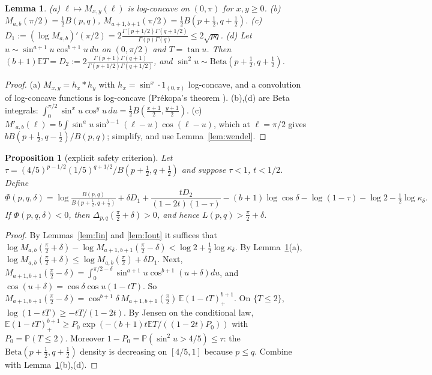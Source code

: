 \documentclass[11pt]{amsart}
\newtheorem{proposition}[theorem]{Proposition}
\newtheorem{lemma}[theorem]{Lemma}
\theoremstyle{definition}
\begin{document}
\begin{lemma}\label{lem:M}
(a) $\ell\mapsto M_{x,y}(\ell)$ is log-concave on $(0,\pi)$ for $x,y\ge0$.
(b) $M_{a,b}(\pi/2)=\frac12B(p,q)$, $M_{a+1,b+1}(\pi/2)=\frac12B(p+\frac12,q+\frac12)$.
(c) $D_1:=(\log M_{a,b})'(\pi/2)=2\frac{\Gamma(p+1/2)\Gamma(q+1/2)}{\Gamma(p)\Gamma(q)}\le2\sqrt{pq}$.
(d) Let $u\sim\sin^{a+1}u\cos^{b+1}u\,du$ on $(0,\pi/2)$ and $T=\tan u$. Then $(b+1)\mathbb E T=D_2:=2\frac{\Gamma(p+1)\Gamma(q+1)}{\Gamma(p+1/2)\Gamma(q+1/2)}$,
and $\sin^2u\sim\mathrm{Beta}(p+\frac12,q+\frac12)$.
\end{lemma}
\begin{proof}
(a) $M_{x,y}=h_x*h_y$ with $h_x=\sin^x\cdot1_{(0,\pi)}$ log-concave, and a convolution of log-concave functions is log-concave (Pr\'ekopa's theorem \cite{Pre}). (b),(d) are Beta integrals:
$\int_0^{\pi/2}\sin^xu\cos^yu\,du=\frac12B(\frac{x+1}2,\frac{y+1}2)$. (c) $M'_{a,b}(\ell)=b\int\sin^au\sin^{b-1}(\ell-u)\cos(\ell-u)$, which at
$\ell=\pi/2$ gives $bB(p+\frac12,q-\frac12)/B(p,q)$; simplify, and use Lemma~\ref{lem:wendel}.
\end{proof}

\begin{proposition}[explicit safety criterion]\label{prop:Phi}
Let $\tau=(4/5)^{p-1/2}(1/5)^{q+1/2}/B(p+\frac12,q+\frac12)$ and suppose $\tau<1$, $t<1/2$. Define
\[
\Phi(p,q,\delta)=\log\tfrac{B(p,q)}{B(p+\frac12,q+\frac12)}+\delta D_1+\frac{tD_2}{(1-2t)(1-\tau)}-(b+1)\log\cos\delta-\log(1-\tau)-\log2-\tfrac12\log\kappa_\delta .
\]
If $\Phi(p,q,\delta)<0$, then $\Delta_{p,q}(\frac\pi2+\delta)>0$, and hence $L(p,q)>\frac\pi2+\delta$.
\end{proposition}
\begin{proof}
By Lemmas~\ref{lem:Iin} and \ref{lem:Iout} it suffices that
$\log M_{a,b}(\frac\pi2+\delta)-\log M_{a+1,b+1}(\frac\pi2-\delta)<\log2+\frac12\log\kappa_\delta$.
By Lemma~\ref{lem:M}(a), $\log M_{a,b}(\frac\pi2+\delta)\le\log M_{a,b}(\frac\pi2)+\delta D_1$.
Next, $M_{a+1,b+1}(\frac\pi2-\delta)=\int_0^{\pi/2-\delta}\sin^{a+1}u\cos^{b+1}(u+\delta)du$, and
$\cos(u+\delta)=\cos\delta\cos u(1-tT)$. So $M_{a+1,b+1}(\frac\pi2-\delta)=\cos^{b+1}\delta\,M_{a+1,b+1}(\frac\pi2)\,\mathbb E(1-tT)_+^{b+1}$.
On $\{T\le2\}$, $\log(1-tT)\ge-tT/(1-2t)$. By Jensen on the conditional law,
$\mathbb E(1-tT)_+^{b+1}\ge P_0\exp(-(b+1)t\mathbb ET/((1-2t)P_0))$ with $P_0=\mathbb P(T\le2)$. Moreover
$1-P_0=\mathbb P(\sin^2u>4/5)\le\tau$: the $\mathrm{Beta}(p+\frac12,q+\frac12)$ density is decreasing on $[4/5,1]$ because $p\le q$.
Combine with Lemma~\ref{lem:M}(b),(d).
\end{proof}
\end{document}
